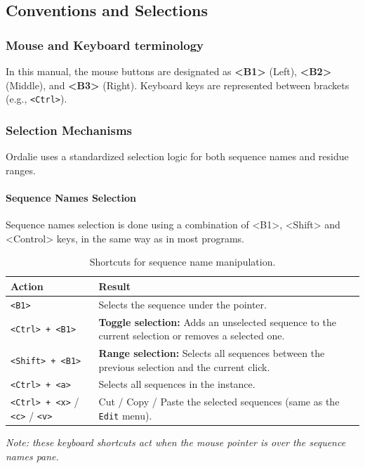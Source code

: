 \documentclass[a4paper]{article}
\begin{document}
\subsection{Conventions and Selections}

\subsubsection{Mouse and Keyboard terminology}
In this manual, the mouse buttons are designated as \textbf{<B1>} (Left), \textbf{<B2>} (Middle), and \textbf{<B3>} (Right). Keyboard keys are represented between brackets (e.g., \texttt{<Ctrl>}).

\subsubsection{Selection Mechanisms}
Ordalie uses a standardized selection logic for both sequence names and residue ranges.

\paragraph{Sequence Names Selection}

Sequence names selection is done using a combination of <B1>, <Shift> and <Control> keys, in the same way as in most programs.
\begin{table}[h!]
\centering
\begin{tabular}{|l|p{10cm}|}
\hline
\textbf{Action} & \textbf{Result} \\
\hline
\hline
\texttt{<B1>} & Selects the sequence under the pointer. \\
\hline
\texttt{<Ctrl> + <B1>} & \textbf{Toggle selection:} Adds an unselected sequence to the current selection or removes a selected one. \\
\hline
\texttt{<Shift> + <B1>} & \textbf{Range selection:} Selects all sequences between the previous selection and the current click. \\
\hline
\texttt{<Ctrl> + <a>} & Selects all sequences in the instance. \\
\hline
\texttt{<Ctrl> + <x>} / \texttt{<c>} / \texttt{<v>} & Cut / Copy / Paste the selected sequences (same as the \texttt{Edit} menu). \\
\hline
\end{tabular}
\caption{Shortcuts for sequence name manipulation.}
\end{table}

\textit{Note: these keyboard shortcuts act when the mouse pointer is over the sequence names pane.}
\end{document}
